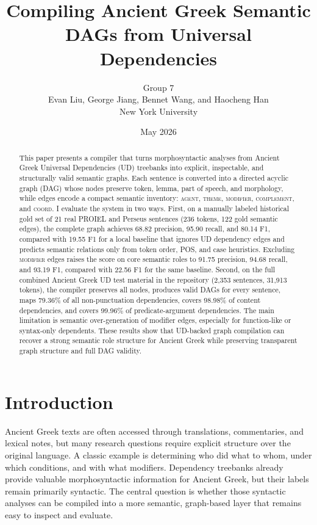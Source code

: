\documentclass[11pt]{article}
\title{Compiling Ancient Greek Semantic DAGs from Universal Dependencies}
\author{
Group 7\\
Evan Liu, George Jiang, Bennet Wang, and Haocheng Han\\
New York University
}
\date{May 2026}
\begin{document}
\maketitle

\begin{abstract}
This paper presents a compiler that turns morphosyntactic analyses from Ancient
Greek Universal Dependencies (UD) treebanks into explicit, inspectable, and
structurally valid semantic graphs. Each sentence is converted into a directed
acyclic graph (DAG) whose nodes preserve token, lemma, part of speech, and
morphology, while edges encode a compact semantic inventory:
\textsc{agent}, \textsc{theme}, \textsc{modifier}, \textsc{complement}, and
\textsc{coord}. I evaluate the system in two ways. First, on a manually labeled
historical gold set of 21 real PROIEL and Perseus sentences (236 tokens, 122
gold semantic edges), the complete graph achieves 68.82 precision, 95.90 recall,
and 80.14 F1, compared with 19.55 F1 for a local baseline that ignores UD
dependency edges and predicts semantic relations only from token order, POS, and
case heuristics. Excluding \textsc{modifier} edges raises the score on core
semantic roles to 91.75 precision, 94.68 recall, and 93.19 F1, compared with
22.56 F1 for the same baseline. Second, on the full combined Ancient Greek UD
test material in the repository (2,353 sentences, 31,913 tokens), the
compiler preserves all nodes, produces valid DAGs for every sentence, maps
79.36\% of all non-punctuation dependencies, covers 98.98\% of content
dependencies, and covers 99.96\% of predicate-argument dependencies. The main
limitation is semantic over-generation of modifier edges, especially for
function-like or syntax-only dependents. These results show that UD-backed
graph compilation can recover a strong semantic role structure for
Ancient Greek while preserving transparent graph structure and full DAG validity.
\end{abstract}

\section{Introduction}
Ancient Greek texts are often accessed through translations, commentaries, and
lexical notes, but many research questions require explicit structure over the
original language. A classic example is determining who did what to whom, under
which conditions, and with what modifiers. Dependency treebanks already provide
valuable morphosyntactic information for Ancient Greek, but their labels remain
primarily syntactic. The central question is whether those syntactic analyses can be
compiled into a more semantic, graph-based layer that remains easy to inspect
and evaluate.
\end{document}
